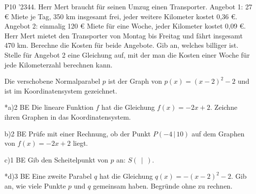 \documentclass[11pt]{article}
\begin{document}
\pfgruppe{}
\begin{pfaufg}{P10 ’23}{\llap{\textasteriskcentered\,}44.}{}
Herr Mert braucht für seinen Umzug einen Transporter. Angebot 1: 27 € Miete je Tag, 350 km insgesamt frei, jeder weitere Kilometer kostet 0,36 €. Angebot 2: einmalig 120 € Miete für eine Woche, jeder Kilometer kostet 0,09 €. Herr Mert mietet den Transporter von Montag bis Freitag und fährt insgesamt 470 km. Berechne die Kosten für beide Angebote. Gib an, welches billiger ist. Stelle für Angebot 2 eine Gleichung auf, mit der man die Kosten einer Woche für jede Kilometerzahl berechnen kann.
\end{pfaufg}

\begin{pfaufg}{}{}{}
Die verschobene Normalparabel $p$ ist der Graph von $p(x) = (x-2)^2 - 2$ und ist im Koordinatensystem gezeichnet.
\par\smallskip\noindent {}\par
\end{pfaufg}
\begin{pfaufg}{}{*a)}{2 BE}
Die lineare Funktion $f$ hat die Gleichung $f(x) = -2x + 2$. Zeichne ihren Graphen in das Koordinatensystem.
\end{pfaufg}
\begin{pfaufg}{}{b)}{2 BE}
Prüfe mit einer Rechnung, ob der Punkt $P(-4\,|\,10)$ auf dem Graphen von $f(x) = -2x + 2$ liegt.
\end{pfaufg}
\begin{pfaufg}{}{c)}{1 BE}
Gib den Scheitelpunkt von $p$ an: $S(\ \ |\ \ )$.
\end{pfaufg}
\begin{pfaufg}{}{*d)}{3 BE}
Eine zweite Parabel $q$ hat die Gleichung $q(x) = -(x-2)^2 - 2$. Gib an, wie viele Punkte $p$ und $q$ gemeinsam haben. Begründe ohne zu rechnen.
\end{pfaufg}
\end{document}
